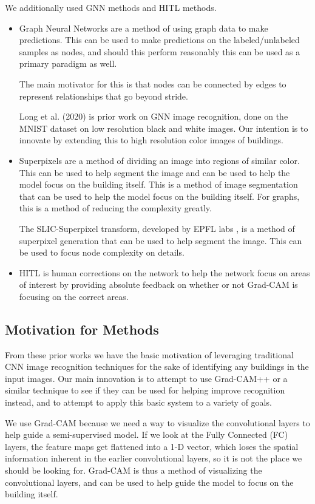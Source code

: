 \documentclass{article}
\begin{document}
We additionally used GNN methods and HITL methods. \begin{itemize}
    \item Graph Neural Networks are a method of using graph data to make predictions. This can be used to make predictions on the labeled/unlabeled samples as nodes, and should this perform reasonably this can be used as a primary paradigm as well. 
    
    The main motivator for this is that nodes can be connected by edges to represent relationships that go beyond stride.

    Long et al.\cite{long} (2020) is prior work on GNN image recognition, done on the MNIST dataset on low resolution black and white images. Our intention is to innovate by extending this to high resolution color images of buildings.

    \item Superpixels are a method of dividing an image into regions of similar color. This can be used to help segment the image and can be used to help the model focus on the building itself. This is a method of image segmentation that can be used to help the model focus on the building itself. For graphs, this is a method of reducing the complexity greatly. 

    The SLIC-Superpixel transform, developed by EPFL labs \cite{epflSLICSuperpixels}, is a method of superpixel generation that can be used to help segment the image. This can be used to focus node complexity on details.
    \item HITL is human corrections on the network to help the network focus on areas of interest by providing absolute feedback on whether or not Grad-CAM is focusing on the correct areas.
\end{itemize}

\subsection{Motivation for Methods}

From these prior works we have the basic motivation of leveraging traditional CNN image recognition techniques for the sake of identifying any buildings in the input images. Our main innovation is to attempt to use Grad-CAM++ or a similar technique to see if they can be used for helping improve recognition instead, and to attempt to apply this basic system to a variety of goals.

We use Grad-CAM because we need a way to visualize the convolutional layers to help guide a semi-supervised model. If we look at the Fully Connected (FC) layers, the feature maps get flattened into a 1-D vector, which loses the spatial information inherent in the earlier convolutional layers, so it is not the place we should be looking for. Grad-CAM is thus a method of visualizing the convolutional layers, and can be used to help guide the model to focus on the building itself.
\end{document}
